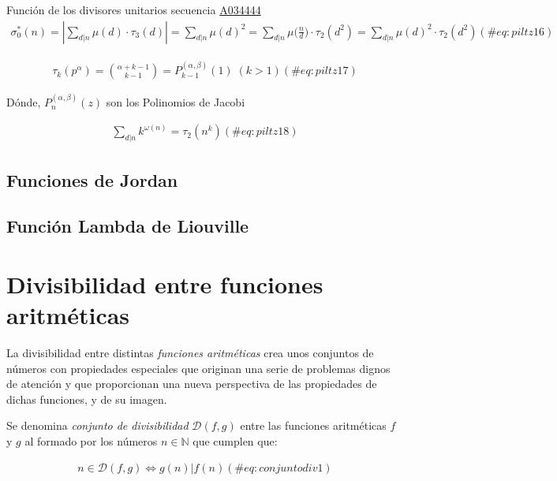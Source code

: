 \documentclass[
  letterpaper,
  DIV=11,
  numbers=noendperiod]{scrreprt}
\begin{document}
Función de los divisores unitarios secuencia
\href{https://oeis.org/A034444}{A034444} \begin{multline}
\sigma_{0}^{*}(n)=
|\sum_{d|n}{\mu(d)\cdot\tau_{3}(d)}|=
\sum_{d|n}{{\mu(d)}^2}=
\sum_{d|n}{\mu\bigg(\frac{n}{d}\bigg)\cdot\tau_{2}(d^{2})}=
\sum_{d|n}{{\mu(d)}^2\cdot\tau_{2}(d^{2})}
(\#eq:piltz16)
\end{multline}

\begin{multline}
\tau_{k}(p^{\alpha})=
\binom{\alpha+k-1}{k-1}=
P_{k-1}^{ (\alpha,\beta) }(1) \; (k>1)
(\#eq:piltz17)
\end{multline}

Dónde, \(P_{n}^{ (\alpha,\beta) }(z)\) son los Polinomios de Jacobi

\begin{multline}
\sum_{d|n}{k^{\omega(n)}}=
\tau_{2}(n^{k})
(\#eq:piltz18)
\end{multline}

\hypertarget{funciones-de-jordan}{%
\subsection{Funciones de Jordan}\label{funciones-de-jordan}}

\hypertarget{funciuxf3n-lambda-de-liouville}{%
\subsection{Función Lambda de
Liouville}\label{funciuxf3n-lambda-de-liouville}}

\hypertarget{divisibilidad-entre-funciones-aritmuxe9ticas}{%
\section{Divisibilidad entre funciones
aritméticas}\label{divisibilidad-entre-funciones-aritmuxe9ticas}}

La divisibilidad entre distintas \emph{funciones aritméticas} crea unos
conjuntos de números con propiedades especiales que originan una serie
de problemas dignos de atención y que proporcionan una nueva perspectiva
de las propiedades de dichas funciones, y de su imagen.

\leavevmode{}%
Se denomina \emph{conjunto de divisibilidad} \(\mathcal{D}(f,g)\) entre
las funciones aritméticas \(f\) y \(g\) al formado por los números
\(n \in \mathbb{N}\) que cumplen que:

\begin{multline} 
n \in \mathcal{D}(f,g) \iff g(n) | f(n)
(\#eq:conjuntodiv1)
\end{multline}
\end{document}
